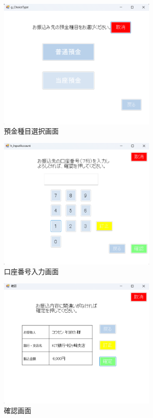 \documentclass{jlreq}
\numberwithin{equation}{section}
\begin{document}
\begin{figure}[H]
  \centering
  \includegraphics[width=0.7\textwidth]{image/g_ChoiceType.png}
  \caption{預金種目選択画面}
  \label{fig:g_ChoiceType}
\end{figure}
\begin{figure}[H]
  \centering
  \includegraphics[width=0.7\textwidth]{image/h_InputAccount.png}
  \caption{口座番号入力画面}
  \label{fig:h_InputAccount}
\end{figure}
\begin{figure}[H]
  \centering
  \includegraphics[width=0.7\textwidth]{image/j_Confirm.png}
  \caption{確認画面}
  \label{fig:j_Confirm}
\end{figure}
\end{document}
